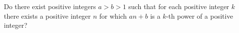 Do there exist positive integers $a>b>1$ such that for each positive integer $k$ there exists a positive integer $n$ for which $an+b$ is a $k$-th power of a positive integer?